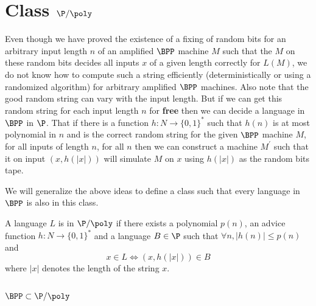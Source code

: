\section{Class $\P/\poly$}

Even though we have proved the existence of a fixing of random bits
for an arbitrary input length $n$ of an amplified $\BPP$ machine $M$
such that the $M$ on these random bits decides all inputs $x$ of a
given length correctly for $L(M)$, we do not know how to compute such
a string efficiently (deterministically or using a randomized
algorithm) for arbitrary amplified $\BPP$ machines. Also note that the
good random string can vary with the input length. But if we can get
this random string for each input length $n$ for \textbf{free} then we
can decide a language in $\BPP$ in $\P$. That if there is a function
$h:N \to \{0,1\}^*$ such that $h(n)$ is at most polynomial in $n$ and
is the correct random string for the given $\BPP$ machine $M$, for all
inputs of length $n$, for all $n$ then we can construct a machine
$M^{'}$ such that it on input $(x,h(|x|))$ will simulate $M$ on $x$
using $h(|x|)$ as the random bits tape.

We will generalize the above ideas to define a class such that every
language in $\BPP$ is also in this class. 

\begin{definition}[$\P/\poly$]
A language $L$ is in $\P/\poly$ if there exists a polynomial $p(n)$, an
advice function $h:N\to \{0,1\}^*$ and a language $B\in \P$ such that
$\forall n,|h(n)|\leq p(n)$ and 
\begin{displaymath}
  x\in L  \iff (x,h(|x|)) \in B 
\end{displaymath}
where $|x|$ denotes the length of the string $x$.

\end{definition}

\subsection{$\BPP \subset \P/\poly$}

